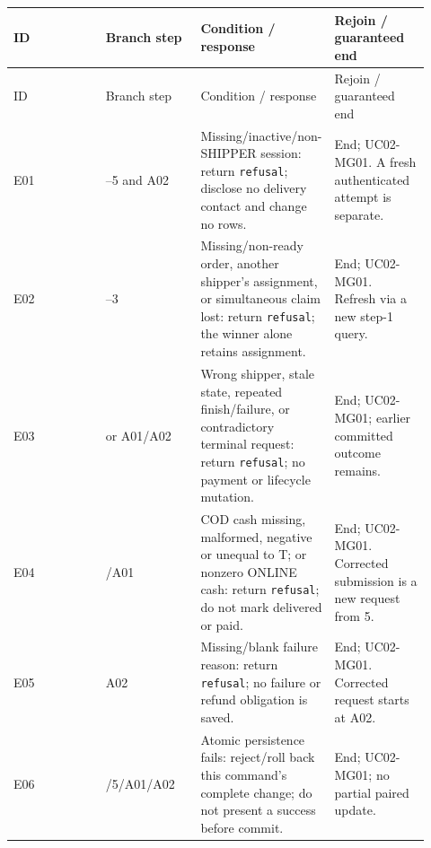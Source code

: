 \begin{longtable}{>{\raggedright\arraybackslash}p{0.2300\linewidth}>{\raggedright\arraybackslash}p{0.2300\linewidth}>{\raggedright\arraybackslash}p{0.2300\linewidth}>{\raggedright\arraybackslash}p{0.2300\linewidth}}
ID & Branch step & Condition / response & Rejoin / guaranteed end \\
\hline\endfirsthead
ID & Branch step & Condition / response & Rejoin / guaranteed end \\
\hline\endhead
E01 & 1--5 and A02 & Missing/inactive/non-SHIPPER session: return \texttt{refusal}; disclose no delivery contact and change no rows. & End; UC02-MG01. A fresh authenticated attempt is separate. \\
E02 & 2--3 & Missing/non-ready order, another shipper's assignment, or simultaneous claim lost: return \texttt{refusal}; the winner alone retains assignment. & End; UC02-MG01. Refresh via a new step-1 query. \\
E03 & 5 or A01/A02 & Wrong shipper, stale state, repeated finish/failure, or contradictory terminal request: return \texttt{refusal}; no payment or lifecycle mutation. & End; UC02-MG01; earlier committed outcome remains. \\
E04 & 5/A01 & COD cash missing, malformed, negative or unequal to T; or nonzero ONLINE cash: return \texttt{refusal}; do not mark delivered or paid. & End; UC02-MG01. Corrected submission is a new request from 5. \\
E05 & A02 & Missing/blank failure reason: return \texttt{refusal}; no failure or refund obligation is saved. & End; UC02-MG01. Corrected request starts at A02. \\
E06 & 3/5/A01/A02 & Atomic persistence fails: reject/roll back this command's complete change; do not present a success before commit. & End; UC02-MG01; no partial paired update. \\
\end{longtable}
